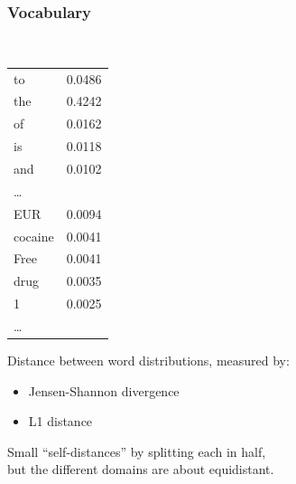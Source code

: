 \documentclass[t,xcolor={svgnames,table},aspectratio=169]{beamer}
\begin{document}
\begin{frame}
	\frametitle{Vocabulary}
	\LARGE
	\begin{flushright}
	\tt\small{}
	\setlength{\tabcolsep}{2pt}
	\begin{tabular}{||lr|}
	\hline
	to & 0.0486 \\
	the & 0.4242 \\
	of & 0.0162 \\
	is & 0.0118 \\
	and & 0.0102 \\
	\ldots & \\
	EUR & 0.0094 \\
	cocaine & 0.0041 \\
	Free & 0.0041 \\
	drug & 0.0035 \\
	1 & 0.0025 \\
	\ldots & \\
	\hline
	\end{tabular}
	\end{flushright}
	\vspace{-55mm}
	
	Distance between word distributions\pause, measured by:
	\begin{minipage}{.43\textwidth}
		\begin{itemize}
			\item Jensen-Shannon divergence
		\end{itemize}
	\end{minipage}
	\begin{minipage}{.3\textwidth}
		\begin{itemize}
			\item L1 distance
		\end{itemize}
	\end{minipage}
	\vfill
	
	Small ``self-distances'' by splitting each in half{\pause}, \\ 
	but the different domains are about equidistant.
	
	\begin{center}
	\end{center}
\end{frame}
\end{document}
